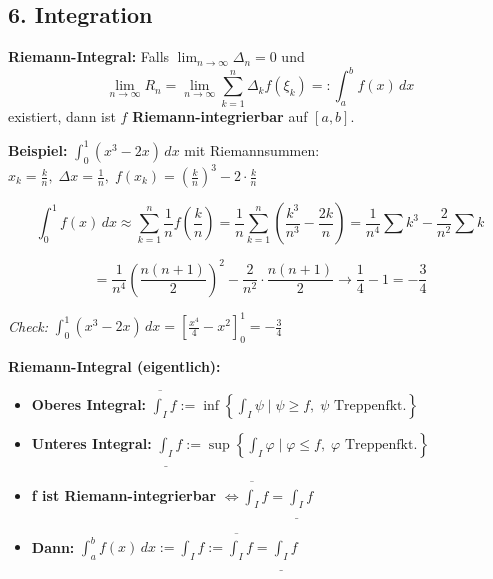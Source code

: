 \subsection{6. Integration}

\textbf{Riemann-Integral:}  
Falls \( \lim_{n \to \infty} \Delta_n = 0 \) und  
\[
\lim_{n \to \infty} R_n = \lim_{n \to \infty} \sum_{k=1}^{n} \Delta_k f(\xi_k) =: \int_a^b f(x)\,dx
\]
existiert, dann ist \( f \) \textbf{Riemann-integrierbar} auf \( [a,b] \).

\textbf{Beispiel:} \( \displaystyle \int_0^1 (x^3 - 2x)\,dx \) mit Riemannsummen:  
\( x_k = \frac{k}{n},\; \Delta x = \frac{1}{n},\; f(x_k) = \left( \frac{k}{n} \right)^3 - 2 \cdot \frac{k}{n} \)

\[
\int_0^1 f(x)\,dx \approx \sum_{k=1}^n \frac{1}{n} f\left(\frac{k}{n}\right)
= \frac{1}{n} \sum_{k=1}^n \left( \frac{k^3}{n^3} - \frac{2k}{n} \right)
= \frac{1}{n^4} \sum k^3 - \frac{2}{n^2} \sum k
\]

\[
= \frac{1}{n^4} \left( \frac{n(n+1)}{2} \right)^2 - \frac{2}{n^2} \cdot \frac{n(n+1)}{2}
\to \frac{1}{4} - 1 = -\frac{3}{4}
\]

\textit{Check:}  
\( \int_0^1 (x^3 - 2x)\,dx = \left[ \frac{x^4}{4} - x^2 \right]_0^1 = -\frac{3}{4} \)

\textbf{Riemann-Integral (eigentlich):}
\begin{itemize}
  \item \textbf{Oberes Integral:} 
    \( \overline{\int_I} f := \inf \left\{ \int_I \psi \mid \psi \ge f,\; \psi \text{ Treppenfkt.} \right\} \)
  \item \textbf{Unteres Integral:} 
    \( \underline{\int_I} f := \sup \left\{ \int_I \varphi \mid \varphi \le f,\; \varphi \text{ Treppenfkt.} \right\} \)
  \item \textbf{f ist Riemann-integrierbar} \( \Leftrightarrow \overline{\int_I} f = \underline{\int_I} f \)
  \item \textbf{Dann:} \( \int_a^b f(x)\,dx := \int_I f := \overline{\int_I} f = \underline{\int_I} f \)
\end{itemize}

